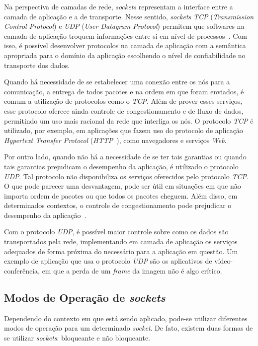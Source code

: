 \documentclass[12pt]{article}
\begin{document}
Na perspectiva de camadas de rede, \textit{sockets} representam a interface
entre a camada de aplicação e a de transporte. Nesse sentido, \textit{sockets}
\emph{TCP} (\emph{Transmission Control Protocol}) e \emph{UDP} (\emph{User
Datagram Protocol}) permitem que softwares na camada de aplicação troquem
informações entre si em nível de processos~\cite{Tanenbaum}. Com isso, é
possível desenvolver protocolos na camada de aplicação com a semântica
apropriada para o domínio da aplicação escolhendo o nível de confiabilidade no
transporte dos dados.

Quando há necessidade de se estabelecer uma conexão entre os nós para a
comunicação, a entrega de todos pacotes e na ordem em que foram enviados, é
comum a utilização de protocolos como o \emph{TCP}. Além de prover esses serviços,
esse protocolo oferece ainda controle de congestionamento e de fluxo de dados,
permitindo um uso mais racional da rede que interliga os nós. O protocolo \emph{TCP} é
utilizado, por exemplo, em aplicações que fazem uso do protocolo de aplicação
\emph{Hypertext Transfer Protocol} (\emph{HTTP}~\cite{HTTP}), como navegadores e serviços \emph{Web}.

Por outro lado, quando não há a necessidade de se ter tais garantias ou quando
tais garantias prejudicam o desempenho da aplicação, é utilizado o protocolo
\emph{UDP}. Tal protocolo não disponibiliza os serviços oferecidos pelo protocolo \emph{TCP}.
O que pode parecer uma desvantagem, pode ser útil em situações em que não
importa ordem de pacotes ou que todos os pacotes cheguem. Além disso, em
determinados contextos, o controle de congestionamento pode prejudicar o
desempenho da aplicação~\cite{Kurose}.

Com o protocolo \emph{UDP}, é possível maior controle sobre como os dados são
transportados pela rede, implementando em camada de aplicação os serviços
adequados de forma próxima do necessário para a aplicação em questão. Um
exemplo de aplicação que usa o protocolo \emph{UDP} são os aplicativos de
vídeo-conferência, em que a perda de um \textit{frame} da imagem não é algo
crítico.

\subsection{Modos de Operação de \textit{sockets}} \label{sub:modos}

Dependendo do contexto em que está sendo aplicado, pode-se utilizar diferentes
modos de operação para um determinado \textit{socket}. De fato, existem duas
formas de se utilizar \emph{sockets}: bloqueante e não bloqueante.
\end{document}

